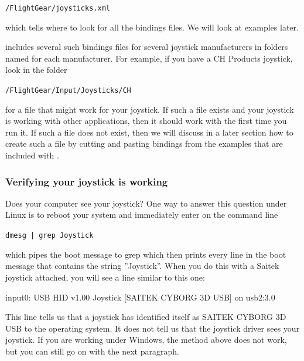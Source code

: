      	\texttt{/FlightGear/joysticks.xml} 
\medskip

\noindent
which tells \FlightGear{} where to look for all the bindings files.  We will
look at examples later.

\FlightGear{} includes several such bindings files for several joystick
manufacturers in folders named for each manufacturer.  For example, if you
have a CH Products joystick, look in the folder
\medskip

    \texttt{/FlightGear/Input/Joysticks/CH}
    \medskip
    
\noindent
for a file that might work for your joystick.  If such a file exists and
your joystick is working with other applications, then it should work with
\FlightGear{} the first time you run it.  If such a file does not exist,
then we will discuss in a later section how to create such a file by cutting
and pasting bindings from the examples that are included with \FlightGear{}.

\subsubsection{Verifying your joystick is working\label{verifying}}
Does your computer see your joystick?  One way to answer this question under Linux is to reboot your system and immediately enter on the command line
\medskip

	\texttt{dmesg | grep Joystick}
\medskip

\noindent
which pipes the boot message to grep which then prints every line in the
boot message that contains the string ''Joystick''.  When you do this with a
Saitek joystick attached, you will see a line similar to this one:
\medskip

\begin{ttfamily}
\noindent
   input0: USB HID v1.00 Joystick [SAITEK CYBORG 3D USB] on usb2:3.0
\end{ttfamily}
\medskip

\noindent
This line tells us that a joystick has identified itself as SAITEK CYBORG 3D USB to the operating system.  It does not tell us that the joystick driver sees your joystick. If you are working under Windows, the method above does not work, but you can still go on with the next paragraph.

